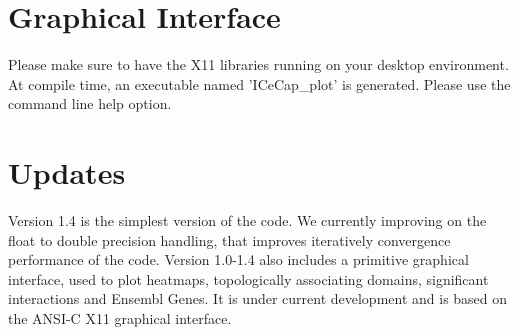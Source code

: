 \documentclass[10pt,a4paper]{article}
\begin{document}
\section{Graphical Interface}

Please make sure to have the X11 libraries running on your desktop environment. 
At compile time, an executable named 'ICeCap\_plot' is generated. Please use the command line help option.
\section*{Updates}

Version 1.4 is the simplest version of the code. We currently improving on the float to double precision handling, that improves iteratively convergence performance of the code. 
Version 1.0-1.4 also includes a primitive graphical interface, used to plot heatmaps, topologically associating domains, significant interactions and Ensembl Genes. It is under current development and is based on the ANSI-C X11 graphical interface.
\end{document}
